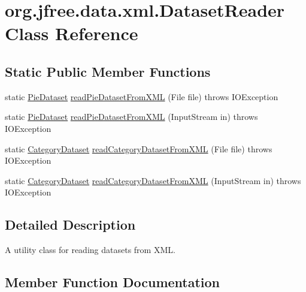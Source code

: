 \hypertarget{classorg_1_1jfree_1_1data_1_1xml_1_1_dataset_reader}{}\section{org.\+jfree.\+data.\+xml.\+Dataset\+Reader Class Reference}
\label{classorg_1_1jfree_1_1data_1_1xml_1_1_dataset_reader}
\subsection*{Static Public Member Functions}
\begin{DoxyCompactItemize}
\item 
static \mbox{\hyperlink{interfaceorg_1_1jfree_1_1data_1_1general_1_1_pie_dataset}{Pie\+Dataset}} \mbox{\hyperlink{classorg_1_1jfree_1_1data_1_1xml_1_1_dataset_reader_a33f34250e5bae5bc925fae02828f2e68}{read\+Pie\+Dataset\+From\+X\+ML}} (File file)  throws I\+O\+Exception 
\item 
static \mbox{\hyperlink{interfaceorg_1_1jfree_1_1data_1_1general_1_1_pie_dataset}{Pie\+Dataset}} \mbox{\hyperlink{classorg_1_1jfree_1_1data_1_1xml_1_1_dataset_reader_adb0fd479ed915ca45ff0229740c82f24}{read\+Pie\+Dataset\+From\+X\+ML}} (Input\+Stream in)  throws I\+O\+Exception 
\item 
static \mbox{\hyperlink{interfaceorg_1_1jfree_1_1data_1_1category_1_1_category_dataset}{Category\+Dataset}} \mbox{\hyperlink{classorg_1_1jfree_1_1data_1_1xml_1_1_dataset_reader_a11f08910d93b681d3703660bc41cd0a8}{read\+Category\+Dataset\+From\+X\+ML}} (File file)  throws I\+O\+Exception 
\item 
static \mbox{\hyperlink{interfaceorg_1_1jfree_1_1data_1_1category_1_1_category_dataset}{Category\+Dataset}} \mbox{\hyperlink{classorg_1_1jfree_1_1data_1_1xml_1_1_dataset_reader_aea2cab88c0e0c8a6eaed6e075cb3ca2f}{read\+Category\+Dataset\+From\+X\+ML}} (Input\+Stream in)  throws I\+O\+Exception 
\end{DoxyCompactItemize}


\subsection{Detailed Description}
A utility class for reading datasets from X\+ML. 

\subsection{Member Function Documentation}
\mbox{\label{classorg_1_1jfree_1_1data_1_1xml_1_1_dataset_reader_a11f08910d93b681d3703660bc41cd0a8}} 

